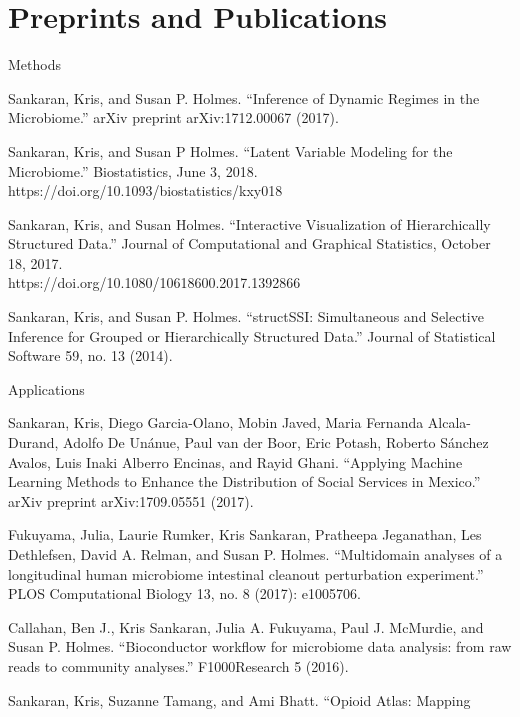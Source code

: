\documentclass[letterpaper]{article}
\renewenvironment{itemize}{
  \begin{list}{}{
    \setlength{\leftmargin}{1.5em}
  }
}{
  \end{list}
}
\begin{document}
\section*{Preprints and Publications}
\begin{itemize}
  \item Methods
\begin{itemize}
 \item Sankaran, Kris, and Susan P. Holmes. ``Inference of Dynamic Regimes in
   the Microbiome.'' arXiv preprint arXiv:1712.00067 (2017).
 \item Sankaran, Kris, and Susan P Holmes. ``Latent Variable Modeling for the
   Microbiome.'' Biostatistics, June 3, 2018.
   https://doi.org/10.1093/biostatistics/kxy018
 \item Sankaran, Kris, and Susan Holmes. “Interactive Visualization of
   Hierarchically Structured Data.” Journal of Computational and Graphical
   Statistics, October 18, 2017. \\
   https://doi.org/10.1080/10618600.2017.1392866
\item Sankaran, Kris, and Susan P. Holmes. ``structSSI: Simultaneous and Selective
  Inference for Grouped or Hierarchically Structured Data.'' Journal of
  Statistical Software 59, no. 13 (2014).
\end{itemize}
\item Applications
  \begin{itemize}
  \item Sankaran, Kris, Diego Garcia-Olano, Mobin Javed, Maria Fernanda
    Alcala-Durand, Adolfo De Unánue, Paul van der Boor, Eric Potash, Roberto
    S\'anchez Avalos, Luis Inaki Alberro Encinas, and Rayid Ghani. ``Applying
    Machine Learning Methods to Enhance the Distribution of Social Services in
    Mexico.'' arXiv preprint arXiv:1709.05551 (2017).
  \item Fukuyama, Julia, Laurie Rumker, Kris Sankaran, Pratheepa Jeganathan, Les
    Dethlefsen, David A. Relman, and Susan P. Holmes. ``Multidomain analyses of a
    longitudinal human microbiome intestinal cleanout perturbation experiment.''
    PLOS Computational Biology 13, no. 8 (2017): e1005706.
  \item Callahan, Ben J., Kris Sankaran, Julia A. Fukuyama, Paul J. McMurdie, and
    Susan P. Holmes. ``Bioconductor workflow for microbiome data analysis: from
    raw reads to community analyses.'' F1000Research 5 (2016).
  \item Sankaran, Kris, Suzanne Tamang, and Ami Bhatt. ``Opioid Atlas: Mapping

\end{itemize}
\end{itemize}
\end{document}
